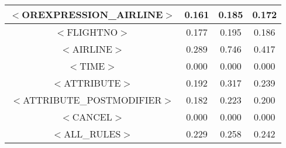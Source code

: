 \documentclass[a4paper,10pt]{article}
\begin{document}
\begin{center}
\begin{tabular}{|c||c|c|c|}
\hline$<$OREXPRESSION\_AIRLINE$>$&0.161&0.185&0.172 \\
\hline$<$FLIGHTNO$>$&0.177&0.195&0.186 \\
\hline$<$AIRLINE$>$&0.289&0.746&0.417 \\
\hline$<$TIME$>$&0.000&0.000&0.000 \\
\hline$<$ATTRIBUTE$>$&0.192&0.317&0.239 \\
\hline$<$ATTRIBUTE\_POSTMODIFIER$>$&0.182&0.223&0.200 \\
\hline$<$CANCEL$>$&0.000&0.000&0.000 \\
\hline
\hline
$<$ALL\_RULES$>$&0.229&0.258&0.242 \\
\hline
\end{tabular}
\end{center}
\pagebreak
{} \label{tab:title} 
\end{document}

